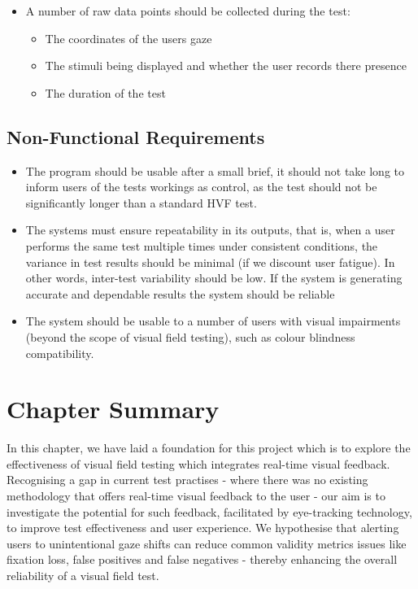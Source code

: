 \documentclass{l4proj}
\begin{document}
\begin{itemize}
    \item A number of raw data points should be collected during the test:
    \begin{itemize}
        \item The coordinates of the users gaze 
        \item The stimuli being displayed and whether the user records there presence
        \item The duration of the test
    \end{itemize}
\end{itemize}

\subsection{Non-Functional Requirements}
\begin{itemize}
    \item The program should be usable after a small brief, it should not take long to inform users of the tests workings as control, as the test should not be significantly longer than a standard HVF test.
    \item The systems must ensure repeatability in its outputs, that is, when a user performs the same test multiple times under consistent conditions, the variance in test results should be minimal (if we discount user fatigue). In other words, inter-test variability should be low. If the system is generating accurate and dependable results the system should be reliable 
    \item The system should be usable to a number of users with visual impairments (beyond the scope of visual field testing), such as colour blindness compatibility.
\end{itemize}
\section{Chapter Summary}
In this chapter, we have laid a foundation for this project which is to explore the effectiveness of visual field testing which integrates real-time visual feedback. Recognising a gap in current test practises - where there was no existing methodology that offers real-time visual feedback to the user - our aim is to investigate the potential for such feedback, facilitated by eye-tracking technology, to improve test effectiveness and user experience. We hypothesise that alerting users to unintentional gaze shifts can reduce common validity metrics issues like fixation loss, false positives and false negatives - thereby enhancing the overall reliability of a visual field test.
\end{document}
